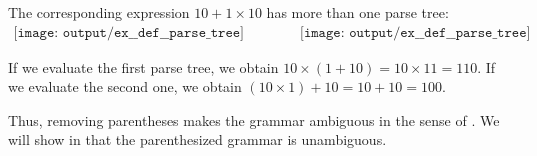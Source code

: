 \begin{example}
\begin{thmenum}
    The corresponding expression \( 10 + 1 \times 10 \) has more than one parse tree:
    \begin{equation*}
      \begin{aligned}
        \texttt{[image: output/ex\_\_def\_\_parse\_tree]}
        \qquad\qquad
        \texttt{[image: output/ex\_\_def\_\_parse\_tree]}
      \end{aligned}
    \end{equation*}

    If we evaluate the first parse tree, we obtain \( 10 \times (1 + 10) = 10 \times 11 = 110 \). If we evaluate the second one, we obtain \( (10 \times 1) + 10 = 10 + 10 = 100 \).

    Thus, removing parentheses makes the grammar ambiguous in the sense of . We will show in  that the parenthesized grammar is unambiguous.
  \end{thmenum}
\end{example}

